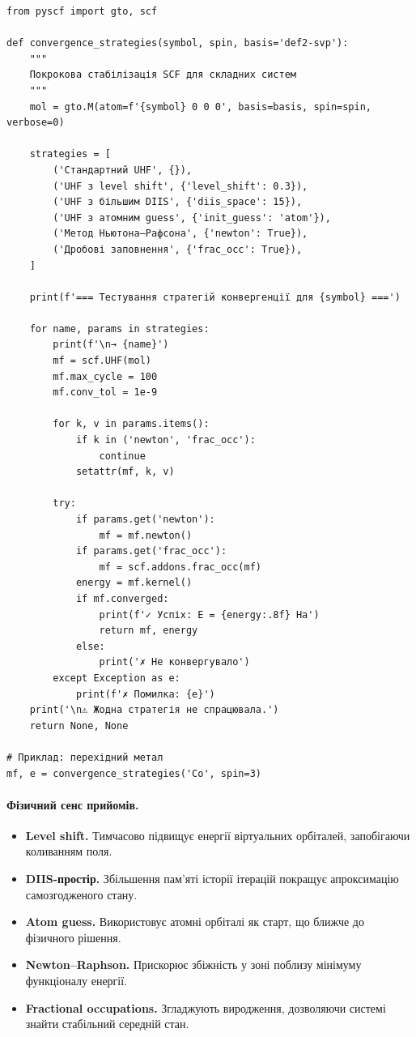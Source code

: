 \begin{verbatim}
from pyscf import gto, scf

def convergence_strategies(symbol, spin, basis='def2-svp'):
    """
    Покрокова стабілізація SCF для складних систем
    """
    mol = gto.M(atom=f'{symbol} 0 0 0', basis=basis, spin=spin, verbose=0)

    strategies = [
        ('Стандартний UHF', {}),
        ('UHF з level shift', {'level_shift': 0.3}),
        ('UHF з більшим DIIS', {'diis_space': 15}),
        ('UHF з атомним guess', {'init_guess': 'atom'}),
        ('Метод Ньютона–Рафсона', {'newton': True}),
        ('Дробові заповнення', {'frac_occ': True}),
    ]

    print(f'=== Тестування стратегій конвергенції для {symbol} ===')

    for name, params in strategies:
        print(f'\n→ {name}')
        mf = scf.UHF(mol)
        mf.max_cycle = 100
        mf.conv_tol = 1e-9

        for k, v in params.items():
            if k in ('newton', 'frac_occ'):
                continue
            setattr(mf, k, v)

        try:
            if params.get('newton'):
                mf = mf.newton()
            if params.get('frac_occ'):
                mf = scf.addons.frac_occ(mf)
            energy = mf.kernel()
            if mf.converged:
                print(f'✓ Успіх: E = {energy:.8f} Ha')
                return mf, energy
            else:
                print('✗ Не конвергувало')
        except Exception as e:
            print(f'✗ Помилка: {e}')
    print('\n⚠ Жодна стратегія не спрацювала.')
    return None, None

# Приклад: перехідний метал
mf, e = convergence_strategies('Co', spin=3)
\end{verbatim}

\paragraph{Фізичний сенс прийомів.}
\begin{itemize}
    \item \textbf{Level shift.} Тимчасово підвищує енергії віртуальних орбіталей, запобігаючи коливанням поля.
    \item \textbf{DIIS-простір.} Збільшення пам’яті історії ітерацій покращує апроксимацію самозгодженого стану.
    \item \textbf{Atom guess.} Використовує атомні орбіталі як старт, що ближче до фізичного рішення.
    \item \textbf{Newton–Raphson.} Прискорює збіжність у зоні поблизу мінімуму функціоналу енергії.
    \item \textbf{Fractional occupations.} Згладжують виродження, дозволяючи системі знайти стабільний середній стан.
\end{itemize}

